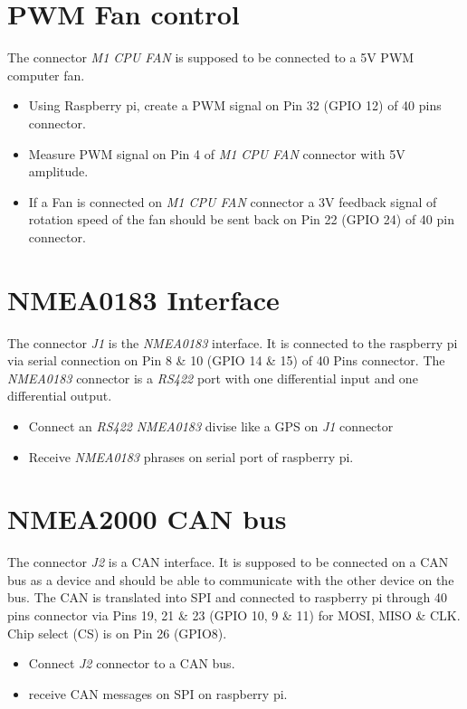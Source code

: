 \documentclass[10pt]{article} %
\begin{document}
\section{PWM Fan control}
The connector \emph{M1 CPU FAN} is supposed to be connected to a 5V PWM computer fan.
\begin{itemize}
\item Using Raspberry pi, create a PWM signal on Pin 32 (GPIO 12) of 40 pins connector.
\item Measure PWM signal on Pin 4 of \emph{M1 CPU FAN} connector with 5V amplitude. 
\item If a Fan is connected on \emph{M1 CPU FAN} connector a 3V feedback signal of rotation speed of the fan should be sent back on Pin 22 (GPIO 24) of 40 pin connector.
\end{itemize}

\section{NMEA0183 Interface}
The connector \emph{J1} is the \emph{NMEA0183} interface. It is connected to the raspberry pi via serial connection on Pin 8 \& 10 (GPIO 14 \& 15) of 40 Pins connector. The \emph{NMEA0183} connector is a \emph{RS422} port with one differential input and one differential output.
\begin{itemize}
\item Connect an \emph{RS422} \emph{NMEA0183} divise like a GPS on \emph{J1} connector
\item Receive \emph{NMEA0183} phrases on serial port of raspberry pi.
\end{itemize}

\section{NMEA2000 CAN bus}
The connector \emph{J2} is a CAN interface. It is supposed to be connected on a CAN bus as a device and should be able to communicate with the other device on the bus. The CAN is translated into SPI and connected to raspberry pi through 40 pins connector via Pins 19, 21 \& 23 (GPIO 10, 9 \& 11) for MOSI, MISO \& CLK. Chip select (CS) is on Pin 26 (GPIO8). 
\begin{itemize}
\item Connect \emph{J2} connector to a CAN bus. 
\item receive CAN messages on SPI on raspberry pi.
\end{itemize}
\end{document}

